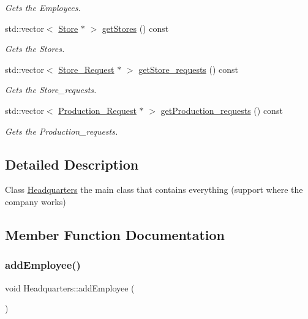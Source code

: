 \begin{DoxyCompactItemize}
\begin{DoxyCompactList}\small\item\em Gets the Employees. \end{DoxyCompactList}\item 
std\+::vector$<$ \hyperlink{class_store}{Store} $\ast$ $>$ \hyperlink{class_headquarters_a37aa3d25dcd693e6537a0bdd361942d8}{get\+Stores} () const
\begin{DoxyCompactList}\small\item\em Gets the Stores. \end{DoxyCompactList}\item 
std\+::vector$<$ \hyperlink{class_store___request}{Store\+\_\+\+Request} $\ast$ $>$ \hyperlink{class_headquarters_a68177abe09961053fe98aa3bcdfb6fdd}{get\+Store\+\_\+requests} () const
\begin{DoxyCompactList}\small\item\em Gets the Store\+\_\+requests. \end{DoxyCompactList}\item 
std\+::vector$<$ \hyperlink{class_production___request}{Production\+\_\+\+Request} $\ast$ $>$ \hyperlink{class_headquarters_a54e99ea57123ca6a53e640a2c95726cc}{get\+Production\+\_\+requests} () const
\begin{DoxyCompactList}\small\item\em Gets the Production\+\_\+requests. \end{DoxyCompactList}\end{DoxyCompactItemize}


\subsection{Detailed Description}
Class \hyperlink{class_headquarters}{Headquarters} the main class that contains everything (support where the company works) 

\subsection{Member Function Documentation}
\mbox{\label{class_headquarters_ac99ce9ba98b3bdddef13fedd5d2528f0}} 
\subsubsection{\texorpdfstring{add\+Employee()}{addEmployee()}}
{\footnotesize\ttfamily void Headquarters\+::add\+Employee (\begin{DoxyParamCaption}{ }\end{DoxyParamCaption})}



